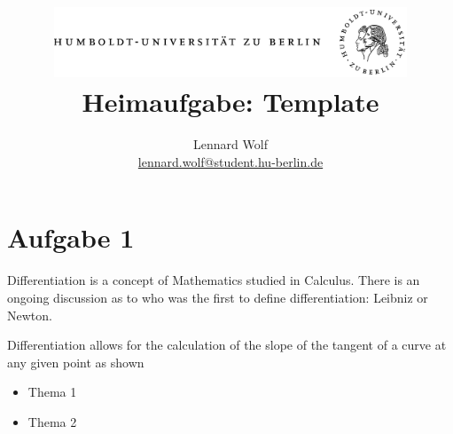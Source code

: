 \documentclass[a4paper]{article}
\begin{document}
\title{
	\includegraphics*[width=0.79\textwidth]{images/hu_logo.png}\\
	\vspace{24pt}
	Heimaufgabe: Template}
\author{Lennard Wolf\\
        \href{mailto:lennard.wolf@student.hu-berlin.de}{lennard.wolf@student.hu-berlin.de}}
\maketitle
\newpage


\section*{Aufgabe 1}


Differentiation is a concept of Mathematics studied in Calculus. There is an ongoing discussion as to who was the first to define differentiation: Leibniz or Newton.


Differentiation allows for the calculation of the slope of the tangent of a curve at any given point as shown

\begin{itemize}
    \item Thema 1
    \item Thema 2
  \end{itemize}
\newpage


\end{document}
